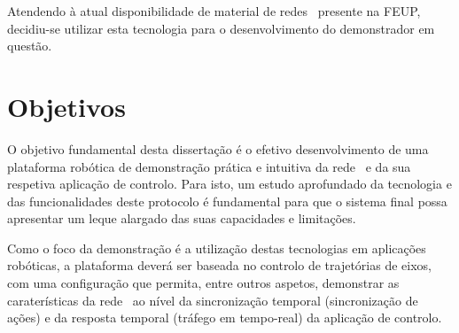 Atendendo à atual disponibilidade de material de redes \ecat\ presente na
FEUP, decidiu-se utilizar esta tecnologia para o desenvolvimento do
demonstrador em questão.


\section{Objetivos}\label{sec:objetivos}

O objetivo fundamental desta dissertação é o efetivo desenvolvimento de
uma plataforma robótica de demonstração prática e intuitiva da rede \ecat\
e da sua respetiva aplicação de controlo. Para isto, um estudo aprofundado
da tecnologia e das funcionalidades deste protocolo é fundamental para
que o sistema final possa apresentar um leque alargado das suas
capacidades e limitações.

Como o foco da demonstração é a utilização destas tecnologias em
aplicações robóticas, a plataforma deverá ser baseada no controlo de
trajetórias de eixos, com uma configuração que permita, entre outros
aspetos, demonstrar as caraterísticas da rede \ecat\ ao nível da
sincronização temporal (sincronização de ações) e da resposta temporal
(tráfego em tempo-real) da aplicação de controlo.
